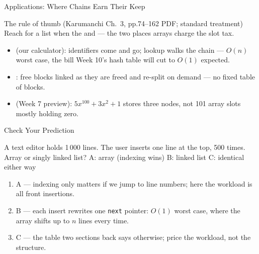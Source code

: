 \documentclass[aspectratio=169]{beamer}
\begin{document}
\begin{frame}{Applications: Where Chains Earn Their Keep}
  \begin{block}{The rule of thumb (Karumanchi Ch.~3, pp.74--162 PDF; standard
    treatment)
    \cite{Karumanchi2017_data_structures_algorithms_made_easy}}
    Reach for a list when the  and
     --- the two places arrays
    charge the slot tax.
  \end{block}
  \begin{itemize}
    \item {} (our calculator): identifiers come and go;
      lookup walks the chain --- $O(n)$ worst case, the bill Week 10's hash
      table will cut to $O(1)$ expected.
    \item {}: free blocks linked as they are freed
      and re-split on demand --- no fixed table of blocks.
    \item {} (Week 7 preview): $5x^{100} + 3x^{2} + 1$ stores
      three nodes, not 101 array slots mostly holding zero.
  \end{itemize}
\end{frame}

\begin{frame}{Check Your Prediction}
  \begin{block}{A text editor holds 1\,000 lines. The user inserts one line at
    the top, 500 times. Array or singly linked list?}
    A: array (indexing wins) \quad B: linked list \quad
    C: identical either way
  \end{block}
  \begin{enumerate}
    \item A --- indexing only matters if we jump to line numbers; here the
      workload is all front insertions.
    \item B --- each insert rewrites one \texttt{next} pointer: $O(1)$ worst
      case, where the array shifts up to $n$ lines every time.
    \item C --- the table two sections back says otherwise; price the
      workload, not the structure.
  \end{enumerate}
\end{frame}

\end{document}
